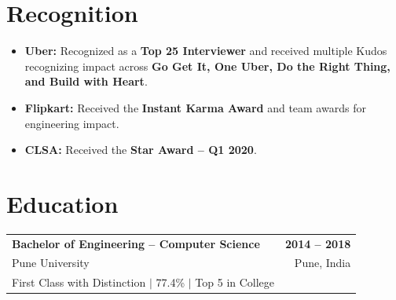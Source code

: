 \documentclass[10pt,a4paper]{article}
\begin{document}
\section{Recognition}

\begin{itemize}

    \item
    \textbf{Uber:} Recognized as a \textbf{Top 25 Interviewer} and received
    multiple Kudos recognizing impact across
    \textbf{Go Get It, One Uber, Do the Right Thing, and Build with Heart}.

    \item
    \textbf{Flipkart:} Received the \textbf{Instant Karma Award}
    and team awards for engineering impact.

    \item
    \textbf{CLSA:} Received the \textbf{Star Award -- Q1 2020}.

\end{itemize}


\section{Education}

\begin{tabularx}{\textwidth}{@{}Xr@{}}

\textbf{Bachelor of Engineering -- Computer Science}
&
\textbf{2014 -- 2018}
\\[2pt]

Pune University
&
Pune, India
\\[2pt]

{\small
First Class with Distinction
$\vert$
77.4\%
$\vert$
Top 5 in College
}
&

\end{tabularx}
\end{document}
